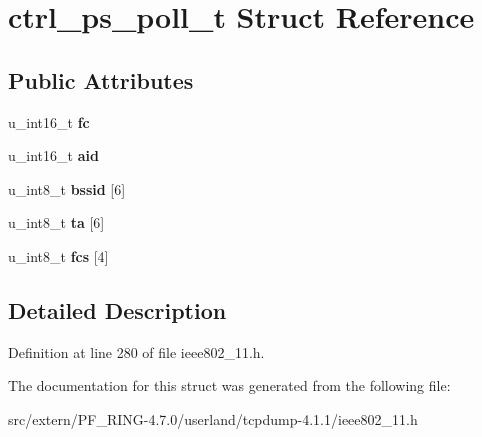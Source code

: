 \hypertarget{structctrl__ps__poll__t}{
\section{ctrl\_\-ps\_\-poll\_\-t Struct Reference}
\label{structctrl__ps__poll__t}
}
\subsection*{Public Attributes}
\begin{DoxyCompactItemize}
\item 
\hypertarget{structctrl__ps__poll__t_ac8fd4863b622c1d4ae365ac73218f785}{
u\_\-int16\_\-t {\bfseries fc}}
\label{structctrl__ps__poll__t_ac8fd4863b622c1d4ae365ac73218f785}

\item 
\hypertarget{structctrl__ps__poll__t_aa0026e09c828363fe2fce78c44f01495}{
u\_\-int16\_\-t {\bfseries aid}}
\label{structctrl__ps__poll__t_aa0026e09c828363fe2fce78c44f01495}

\item 
\hypertarget{structctrl__ps__poll__t_a42e15b0e2af1edbb5a2221f73d855947}{
u\_\-int8\_\-t {\bfseries bssid} \mbox{[}6\mbox{]}}
\label{structctrl__ps__poll__t_a42e15b0e2af1edbb5a2221f73d855947}

\item 
\hypertarget{structctrl__ps__poll__t_a16b3a23970ec8202fbffbd04800d0eb0}{
u\_\-int8\_\-t {\bfseries ta} \mbox{[}6\mbox{]}}
\label{structctrl__ps__poll__t_a16b3a23970ec8202fbffbd04800d0eb0}

\item 
\hypertarget{structctrl__ps__poll__t_a9458f7b5d0a9b634e189c72056ca9d4f}{
u\_\-int8\_\-t {\bfseries fcs} \mbox{[}4\mbox{]}}
\label{structctrl__ps__poll__t_a9458f7b5d0a9b634e189c72056ca9d4f}

\end{DoxyCompactItemize}


\subsection{Detailed Description}


Definition at line 280 of file ieee802\_\-11.h.



The documentation for this struct was generated from the following file:\begin{DoxyCompactItemize}
\item 
src/extern/PF\_\-RING-\/4.7.0/userland/tcpdump-\/4.1.1/ieee802\_\-11.h\end{DoxyCompactItemize}
